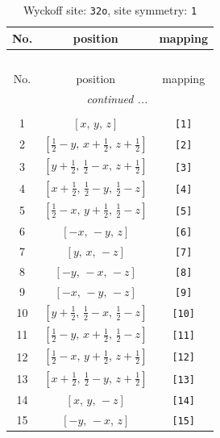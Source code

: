 \documentclass[fleqn,8pt]{jsarticle}
\begin{document}
\renewcommand{\arraystretch}{1.2}
\begin{longtable}{ccc}
\caption{Wyckoff site: {\tt 32o}, site symmetry: {\tt 1}}
 \\
 \hline \hline
No. & position & mapping \\ \hline \endfirsthead

\multicolumn{2}{l}{\tablename\ \thetable{}} \\
 \hline \hline
No. & position & mapping \\ \hline \endhead

 \hline \hline
\multicolumn{2}{r}{\footnotesize\it continued ...} \\ \endfoot

 \hline \hline
\multicolumn{2}{r}{} \\ \endlastfoot

1 & $\left[ x,\, y,\, z \right]$ & {\tt [1]} \\ \hline
2 & $\left[ \frac{1}{2} - y,\, x + \frac{1}{2},\, z + \frac{1}{2} \right]$ & {\tt [2]} \\ \hline
3 & $\left[ y + \frac{1}{2},\, \frac{1}{2} - x,\, z + \frac{1}{2} \right]$ & {\tt [3]} \\ \hline
4 & $\left[ x + \frac{1}{2},\, \frac{1}{2} - y,\, \frac{1}{2} - z \right]$ & {\tt [4]} \\ \hline
5 & $\left[ \frac{1}{2} - x,\, y + \frac{1}{2},\, \frac{1}{2} - z \right]$ & {\tt [5]} \\ \hline
6 & $\left[ - x,\, - y,\, z \right]$ & {\tt [6]} \\ \hline
7 & $\left[ y,\, x,\, - z \right]$ & {\tt [7]} \\ \hline
8 & $\left[ - y,\, - x,\, - z \right]$ & {\tt [8]} \\ \hline
9 & $\left[ - x,\, - y,\, - z \right]$ & {\tt [9]} \\ \hline
10 & $\left[ y + \frac{1}{2},\, \frac{1}{2} - x,\, \frac{1}{2} - z \right]$ & {\tt [10]} \\ \hline
11 & $\left[ \frac{1}{2} - y,\, x + \frac{1}{2},\, \frac{1}{2} - z \right]$ & {\tt [11]} \\ \hline
12 & $\left[ \frac{1}{2} - x,\, y + \frac{1}{2},\, z + \frac{1}{2} \right]$ & {\tt [12]} \\ \hline
13 & $\left[ x + \frac{1}{2},\, \frac{1}{2} - y,\, z + \frac{1}{2} \right]$ & {\tt [13]} \\ \hline
14 & $\left[ x,\, y,\, - z \right]$ & {\tt [14]} \\ \hline
15 & $\left[ - y,\, - x,\, z \right]$ & {\tt [15]} \\ \hline

\end{longtable}
\end{document}
